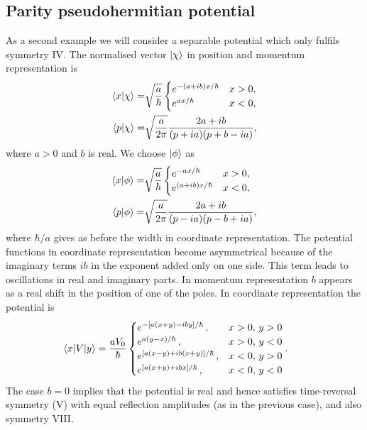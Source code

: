 \subsection{Parity pseudohermitian potential}
%
%
As a second example we will consider  a separable potential which only fulfils symmetry IV. The normalised vector $\ket{\chi}$ in position and momentum representation is
%
\begin{eqnarray}
\braket{x}{\chi}=& \sqrt{\frac{a}{\hbar}} \begin{cases}
e^{-(a+ib)x/\hbar}  &x>0,\\ e^{a x/\hbar} &x<0,
\end{cases} \nonumber \\
\braket{p}{\chi}=&  \sqrt{\frac{a}{2\pi}} \frac{2 a+ i b}{(p+ia)(p+b-i a)},
\end{eqnarray}
%
where $a>0$ and $b$ is real.
We choose $\ket{\phi}$ as
%
\begin{eqnarray}
\braket{x}{\phi}=& \sqrt{\frac{a}{\hbar}} \begin{cases}
e^{-a x/\hbar} &x>0,\\ e^{(a+i b)x/\hbar} &x<0,
\end{cases} \nonumber \\
\braket{p}{\phi}=& \sqrt{\frac{a}{2\pi}} \frac{2 a+i b}{(p-ia)(p-b+i a)},
\end{eqnarray}
%
where $\hbar/a$ gives as before the width in coordinate representation. The potential functions in coordinate representation become asymmetrical
because of the  imaginary terms  $ib$ in  the exponent added only on  one side. This term leads to oscillations in real and imaginary parts. In momentum representation $b$ appears as a real shift in the position of one of the poles.
%
In coordinate representation the potential is
%
\begin{eqnarray}
\hspace*{-0.6cm}\la x|V|y\ra=  \frac{aV_{0}}{\hbar} \begin{cases}
e^{-\left[a (x+y) - i b y\right]/\hbar} \, ,&x>0,\,y>0\\
e^{a(y-x)/\hbar} \,  ,&x>0, \,y<0\\
e^{\left[a(x-y)+i b(x+y)\right]/\hbar} \,  ,&x<0,\,y>0\\
e^{\left[a(x+y)+i b x\right]/\hbar} \,  ,&x<0,\,y<0
\end{cases}.
\label{Ppot}
\end{eqnarray}
%
The case $b=0$ implies that the potential is real and hence satisfies time-reversal symmetry (V) with equal reflection amplitudes (as in the previous case), and also symmetry VIII.


